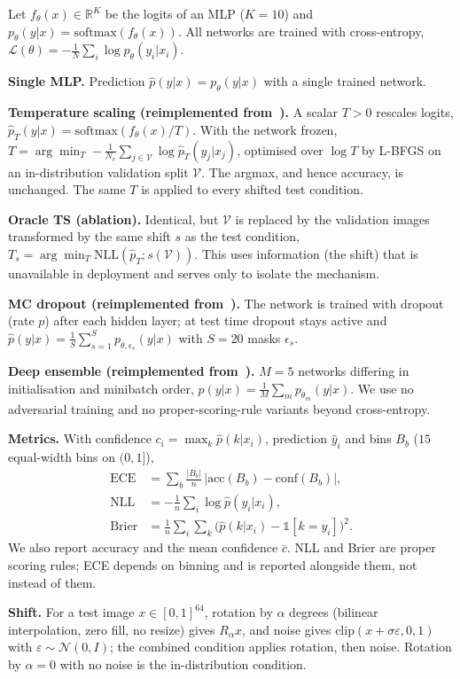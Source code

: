 Let $f_\theta(x)\in\mathbb{R}^{K}$ be the logits of an MLP ($K=10$) and $p_\theta(y|x)=\mathrm{softmax}(f_\theta(x))$. All networks are trained with cross-entropy, $\mathcal{L}(\theta)=-\tfrac1N\sum_i\log p_\theta(y_i|x_i)$.

\textbf{Single MLP.} Prediction $\hat p(y|x)=p_\theta(y|x)$ with a single trained network.

\textbf{Temperature scaling (reimplemented from~\cite{guo2017calibration}).} A scalar $T>0$ rescales logits, $\hat p_T(y|x)=\mathrm{softmax}(f_\theta(x)/T)$. With the network frozen, $T=\arg\min_{T}-\tfrac1{N_v}\sum_{j\in\mathcal V}\log \hat p_T(y_j|x_j)$, optimised over $\log T$ by L-BFGS on an in-distribution validation split $\mathcal V$. The argmax, and hence accuracy, is unchanged. The same $T$ is applied to every shifted test condition. 

\textbf{Oracle TS (ablation).} Identical, but $\mathcal V$ is replaced by the validation images transformed by the same shift $s$ as the test condition, $T_s=\arg\min_T \mathrm{NLL}(\hat p_T; s(\mathcal V))$. This uses information (the shift) that is unavailable in deployment and serves only to isolate the mechanism.

\textbf{MC dropout (reimplemented from~\cite{gal2015dropout}).} The network is trained with dropout (rate $p$) after each hidden layer; at test time dropout stays active and $\hat p(y|x)=\tfrac1S\sum_{s=1}^S p_{\theta,\epsilon_s}(y|x)$ with $S=20$ masks $\epsilon_s$.

\textbf{Deep ensemble (reimplemented from~\cite{lakshminarayanan2016simple}).} $M=5$ networks differing in initialisation and minibatch order, $\hat p(y|x)=\tfrac1M\sum_m p_{\theta_m}(y|x)$. We use no adversarial training and no proper-scoring-rule variants beyond cross-entropy.

\textbf{Metrics.} With confidence $c_i=\max_k\hat p(k|x_i)$, prediction $\hat y_i$ and bins $B_b$ ($15$ equal-width bins on $(0,1]$),
\begin{align}
\mathrm{ECE}&=\sum_{b}\tfrac{|B_b|}{n}\,\big|\mathrm{acc}(B_b)-\mathrm{conf}(B_b)\big|,\\
\mathrm{NLL}&=-\tfrac1n\sum_i\log\hat p(y_i|x_i),\\
\mathrm{Brier}&=\tfrac1n\sum_i\sum_k\big(\hat p(k|x_i)-\mathbb 1[k=y_i]\big)^2 .
\end{align}
We also report accuracy and the mean confidence $\bar c$. NLL and Brier are proper scoring rules; ECE depends on binning and is reported alongside them, not instead of them.

\textbf{Shift.} For a test image $x\in[0,1]^{64}$, rotation by $\alpha$ degrees (bilinear interpolation, zero fill, no resize) gives $R_\alpha x$, and noise gives $\mathrm{clip}(x+\sigma\varepsilon,0,1)$ with $\varepsilon\sim\mathcal N(0,I)$; the combined condition applies rotation, then noise. Rotation by $\alpha=0$ with no noise is the in-distribution condition.
